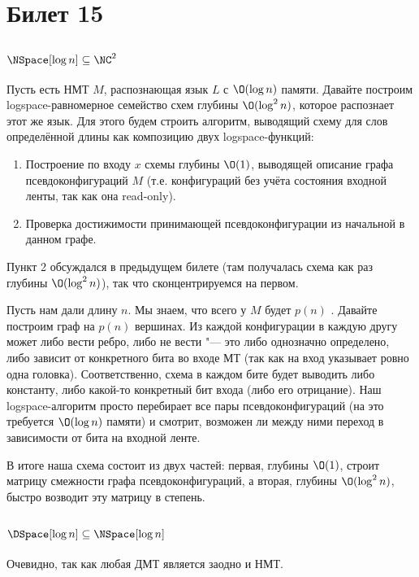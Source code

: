 \setcounter{section}{14}
\section{Билет 15}
\subsection[{NSpace[log n] <= NC2}]{$\NSpace[\log n] \subseteq \NC^2$}
	Пусть есть НМТ $M$, распознающая язык $L$ с $\O(\log n)$ памяти.
	Давайте построим logspace-равномерное семейство схем глубины $\O(\log^2 n)$, которое распознает этот же язык.
	Для этого будем строить алгоритм, выводящий схему для слов определённой длины как композицию двух logspace-функций:
	\begin{enumerate}
		\item
			Построение по входу $x$ схемы глубины $\O(1)$, выводящей описание
			графа псевдоконфигураций $M$ (т.е. конфигураций без учёта состояния входной ленты, так как она read-only).
		\item Проверка достижимости принимающей псевдоконфигурации из начальной в данном графе.
	\end{enumerate}
	Пункт 2 обсуждался в предыдущем билете (там получалась схема как раз глубины $\O(\log^2 n)$), так что сконцентрируемся на первом.

	Пусть нам дали длину $n$.
	Мы знаем, что всего у $M$ будет $p(n)$ .
	Давайте построим граф на $p(n)$ вершинах.
	Из каждой конфигурации в каждую другу может либо вести ребро, либо не вести "--- это либо однозначно определено, либо
	зависит от конкретного бита во входе МТ (так как на вход указывает ровно одна головка).
	Соответственно, схема в каждом бите будет выводить либо константу, либо какой-то конкретный бит входа (либо его отрицание).
    Наш logspace-алгоритм просто перебирает все пары псевдоконфигураций (на это требуется $\O(\log n)$ памяти) и смотрит,
    возможен ли между ними переход в зависимости от бита на входной ленте.

    В итоге наша схема состоит из двух частей: первая, глубины $\O(1)$, строит матрицу смежности графа псевдоконфигураций,
    а вторая, глубины $\O(\log^2 n)$, быстро возводит эту матрицу в степень.

\subsection[{DSpace[log n] <= NSpace[log n]}]{$\DSpace[\log n] \subseteq \NSpace[\log n]$}
	Очевидно, так как любая ДМТ является заодно и НМТ.

